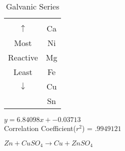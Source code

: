 \documentclass{article}
\begin{document}
    \begin{center}
        \begin{longtable}[c]{| c c |}
            \caption{Galvanic Series \label{long}}\\
            \hline
            $ $ & $ $\\
            $\uparrow$ & Ca\\
            Most & Ni\\
            Reactive & Mg\\
            Least & Fe\\
            $\downarrow$ & Cu\\
            $  $ & Sn\\
            \hline
        \end{longtable}
    \end{center}

    \begin{center}
        $ y = 6.84098x  + -0.03713 $\\
        Correlation Coefficient($r^{2}$) = $.9949121$
    \end{center}

    $ Zn + CuSO_{4} \longrightarrow Cu + ZnSO_{4} $
\end{document}
